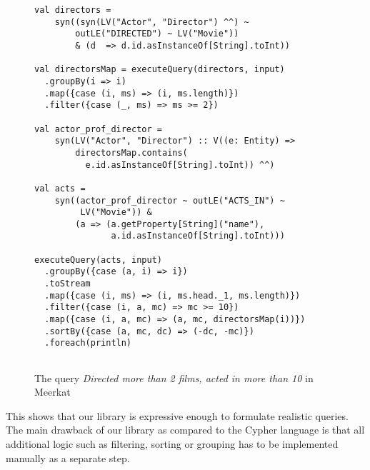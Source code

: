 \begin{figure}[h]
\begin{lstlisting}
val directors = 
    syn((syn(LV("Actor", "Director") ^^) ~ 
        outLE("DIRECTED") ~ LV("Movie"))
        & (d  => d.id.asInstanceOf[String].toInt))
 
val directorsMap = executeQuery(directors, input)
  .groupBy(i => i)
  .map({case (i, ms) => (i, ms.length)})
  .filter({case (_, ms) => ms >= 2})
 
val actor_prof_director = 
    syn(LV("Actor", "Director") :: V((e: Entity) =>
        directorsMap.contains(
          e.id.asInstanceOf[String].toInt)) ^^)
 
val acts = 
    syn((actor_prof_director ~ outLE("ACTS_IN") ~ 
         LV("Movie")) &
        (a => (a.getProperty[String]("name"), 
               a.id.asInstanceOf[String].toInt)))
 
executeQuery(acts, input)
  .groupBy({case (a, i) => i})
  .toStream
  .map({case (i, ms) => (i, ms.head._1, ms.length)})
  .filter({case (i, a, mc) => mc >= 10})
  .map({case (i, a, mc) => (a, mc, directorsMap(i))})
  .sortBy({case (a, mc, dc) => (-dc, -mc)})
  .foreach(println)
    
\end{lstlisting}
\caption{The query \emph{Directed more than 2 films, acted in more than 10} in Meerkat}
\label{fig:helpers}
\end{figure}


This shows that our library is expressive enough to formulate realistic queries.
The main drawback of our library as compared to the Cypher language is that all additional logic such as
filtering, sorting or grouping has to be implemented manually as a separate step.

